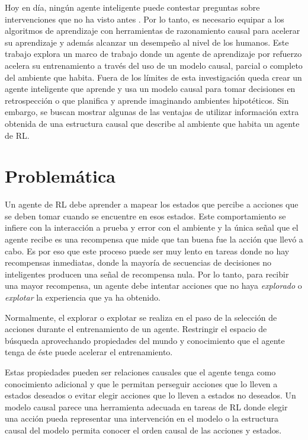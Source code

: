 Hoy en día, ningún agente inteligente puede contestar 
preguntas sobre intervenciones que no ha visto antes 
\cite{pearl2018theoretical}. Por lo tanto, es necesario equipar a
los algoritmos de aprendizaje con herramientas de razonamiento
causal para acelerar su aprendizaje y además alcanzar 
un desempeño al nivel de los humanos.
Este trabajo explora un marco de trabajo donde un agente
de aprendizaje por refuerzo acelera su entrenamiento a través
del uso de un modelo causal, parcial o completo del ambiente
que habita. Fuera de los límites de
esta investigación queda
crear un agente inteligente que aprende y usa un modelo causal para tomar decisiones en retrospección o que
planifica y aprende imaginando ambientes hipotéticos.
Sin embargo, se buscan mostrar algunas de las ventajas de utilizar información extra obtenida de una estructura causal que 
describe al ambiente que habita un agente de RL.


\section{Problemática}

Un agente de RL debe aprender a mapear los estados
que percibe a acciones que se deben tomar cuando
se encuentre en esos estados. Este comportamiento
se infiere con la interacción a prueba y error con el ambiente y la única señal que el agente recibe es una recompensa que mide que tan buena fue la acción que llevó a cabo. Es por eso que este proceso puede ser muy lento en tareas donde no hay recompensas inmediatas, donde la mayoría de secuencias
de decisiones no inteligentes producen una señal de recompensa nula.
Por lo tanto, para recibir una mayor recompensa, un agente debe intentar acciones que no haya \textit{explorado} o \textit{explotar} la experiencia que ya ha obtenido.

Normalmente, el explorar o explotar se realiza en el 
paso de la selección de acciones durante el entrenamiento de un agente. Restringir el espacio de búsqueda aprovechando 
propiedades del mundo y conocimiento que el agente tenga
de éste puede acelerar el entrenamiento.

Estas propiedades pueden ser relaciones causales 
que el agente tenga como conocimiento adicional
y que le permitan perseguir acciones que lo lleven a
estados deseados o evitar elegir acciones que lo lleven a 
estados no deseados. Un modelo causal parece una herramienta adecuada en
tareas de RL donde elegir una acción pueda representar una intervención en el modelo o la estructura causal del modelo permita conocer el orden causal de las acciones y estados.

